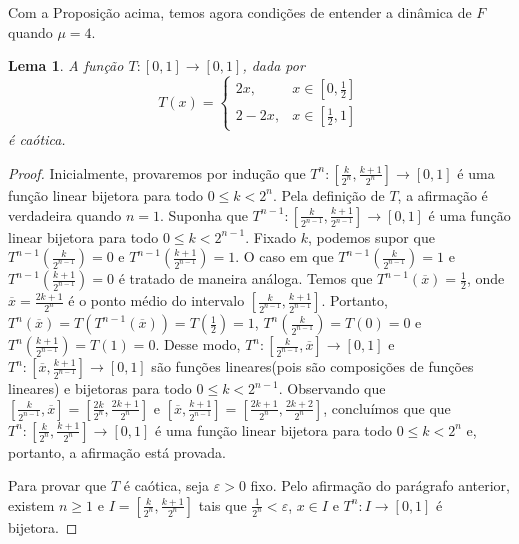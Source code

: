 \documentclass[a4paper, 12pt]{article}
\theoremstyle{definition}
\theoremstyle{plain}
\theoremstyle{plain}
\newtheorem{lemma}[definition]{Lema}
\theoremstyle{plain}
\theoremstyle{definition}
\theoremstyle{remark}
\begin{document}
Com a Proposição acima, temos agora condições de entender a dinâmica de $F$ quando $\mu = 4$.

\begin{lemma}
\label{lemma 5 1}
A função $T: [0,1] \to [0,1]$, dada por
\[
T(x) = 
  \begin{cases}
      2x, & x \in [0, \frac{1}{2}] \\
      2 - 2x, & x \in [\frac{1}{2}, 1] 
  \end{cases}
\]
é caótica.
\end{lemma}

\begin{proof}
Inicialmente, provaremos por indução que $T^n: \left[\frac{k}{2^n}, \frac{k+1}{2^n}\right] \to [0,1]$ é uma função linear bijetora para todo $0 \leq k  < 2^n$. Pela definição de $T$, a afirmação é verdadeira quando $n = 1$. Suponha que $T^{n-1}: \left[\frac{k}{2^{n-1}}, \frac{k+1}{2^{n-1}}\right] \to [0,1]$ é uma função linear bijetora para todo $0 \leq k < 2^{n-1}$. Fixado $k$, podemos supor que $T^{n-1}\left(\frac{k}{2^{n-1}}\right) = 0$ e $T^{n-1}\left(\frac{k+1}{2^{n-1}}\right) = 1$. O caso em que $T^{n-1}\left(\frac{k}{2^{n-1}}\right) = 1$ e $T^{n-1}\left(\frac{k+1}{2^{n-1}}\right) = 0$ é tratado de maneira análoga. Temos que $T^{n-1}(\overline{x}) = \frac{1}{2}$, onde $\overline{x} = \frac{2k+1}{2^n}$ é o ponto médio do intervalo $\left[\frac{k}{2^{n-1}}, \frac{k+1}{2^{n-1}}\right]$. Portanto, $T^n(\overline{x}) = T(T^{n-1}(\overline{x})) = T\left(\frac{1}{2}\right) = 1$, $T^n\left(\frac{k}{2^{n-1}}\right) = T(0) = 0$ e $T^n\left(\frac{k+1}{2^{n-1}}\right) = T(1) = 0$. Desse modo, $T^n: \left[\frac{k}{2^{n-1}}, \overline{x}\right] \to [0,1]$ e $T^n: \left[\overline{x}, \frac{k+1}{2^{n-1}}\right] \to [0,1]$ são funções lineares(pois são composições de funções lineares) e bijetoras para todo $0 \leq k < 2^{n-1}$. Observando que $\left[\frac{k}{2^{n-1}}, \overline{x}\right] =  \left[\frac{2k}{2^n}, \frac{2k+1}{2^n}\right]$ e $\left[\overline{x}, \frac{k+1}{2^{n-1}}\right] =  \left[\frac{2k+1}{2^n}, \frac{2k+2}{2^n}\right]$, concluímos que  que $T^n: \left[\frac{k}{2^n}, \frac{k+1}{2^n}\right] \to [0,1]$ é uma função linear bijetora para todo $0 \leq k  < 2^n$ e, portanto, a afirmação está provada.

Para provar que $T$ é caótica, seja $\varepsilon > 0$ fixo. Pelo afirmação do parágrafo anterior, existem $n \geq 1$ e $I = \left[\frac{k}{2^n}, \frac{k+1}{2^n}\right]$  tais que $\frac{1}{2^n} < \varepsilon$, $x \in I$ e $T^n: I \to [0,1]$ é bijetora.


\end{proof}
\end{document}

